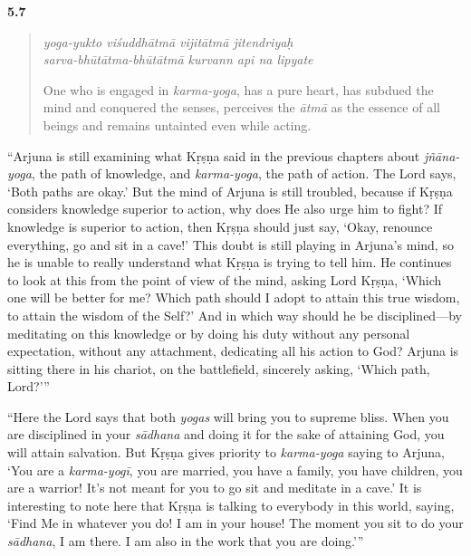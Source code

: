 \par\noindent\textbf{5.7}\par
\begin{verse}
\textit{yoga-yukto viśuddhātmā vijitātmā jitendriyaḥ} \\
\textit{sarva-bhūtātma-bhūtātmā kurvann api na lipyate}

\noindent One who is engaged in \textit{karma-yoga}, has a pure heart, has subdued the mind and conquered the senses, perceives the \textit{ātmā} as the essence of all beings and remains untainted even while acting.
\end{verse}
\par


\enquote{Arjuna is still examining what Kṛṣṇa said in the previous chapters about \textit{jñāna-yoga}, the path of knowledge, and \textit{karma-yoga}, the path of action. The Lord says, \enquote{Both paths are okay.} But the mind of Arjuna is still troubled, because if Kṛṣṇa considers knowledge superior to action, why does He also urge him to fight? If knowledge is superior to action, then Kṛṣṇa should just say, \enquote{Okay, renounce everything, go and sit in a cave!} This doubt is still playing in Arjuna’s mind, so he is unable to really understand what Kṛṣṇa is trying to tell him. He continues to look at this from the point of view of the mind, asking Lord Kṛṣṇa, \enquote{Which one will be better for me? Which path should I adopt to attain this true wisdom, to attain the wisdom of the Self?} And in which way should he be disciplined---by meditating on this knowledge or by doing his duty without any personal expectation, without any attachment, dedicating all his action to God? Arjuna is sitting there in his chariot, on the battlefield, sincerely asking, \enquote{Which path, Lord?}}

\enquote{Here the Lord says that both \textit{yogas} will bring you to supreme bliss. When you are disciplined in your \textit{sādhana} and doing it for the sake of attaining God, you will attain salvation. But Kṛṣṇa gives priority to \textit{karma-yoga} saying to Arjuna, \enquote{You are a \textit{karma-yogī}, you are married, you have a family, you have children, you are a warrior! It’s not meant for you to go sit and meditate in a cave.} It is interesting to note here that Kṛṣṇa is talking to everybody in this world, saying, \enquote{Find Me in whatever you do! I am in your house! The moment you sit to do your \textit{sādhana}, I am there. I am also in the work that you are doing.}}

